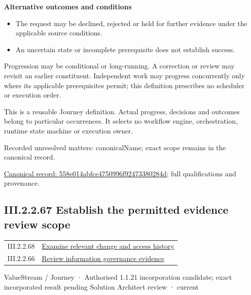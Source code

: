 \par\medskip\textbf{Alternative outcomes and conditions}\par


\begin{itemize}


\item The request may be declined, rejected or held for further evidence under the applicable source conditions.

\item An uncertain state or incomplete prerequisite does not establish success.

\end{itemize}


Progression may be conditional or long-running. A correction or review may revisit an earlier constituent. Independent work may progress concurrently only where its applicable prerequisites permit; this definition prescribes no scheduler or execution order.



This is a reusable Journey definition. Actual progress, decisions and outcomes belong to particular occurrences. It selects no workflow engine, orchestration, runtime state machine or execution owner.


{\small Recorded unresolved matters: canonicalName; exact scope remains in the canonical record.}\par
{\footnotesize \href{../../../../continuum/strategy/value-stream/558e014abfce4750996f92473380284d.md}{Canonical record: 558e014abfce4750996f92473380284d}; full qualifications and provenance.}\par
\subsection*{III.2.2.67 Establish the permitted evidence review scope}
\label{navigation:III.2.2.67}

\begin{longtable}{p{.22\linewidth}p{.73\linewidth}}
III.2.2.68 & \hyperref[element:39211c37cd3c4d3a8cdfe49d044c7f43]{Examine relevant change and access history} \\
III.2.2.66 & \hyperref[element:558e014abfce4750996f92473380284d]{Review information governance evidence} \\
\end{longtable}
\label{element:88a66a2803c04a93a157a19d05297bee}
{\small ValueStream / Journey · Authorised 1.1.21 incorporation candidate; exact incorporated result pending Solution Architect review · current}\par


